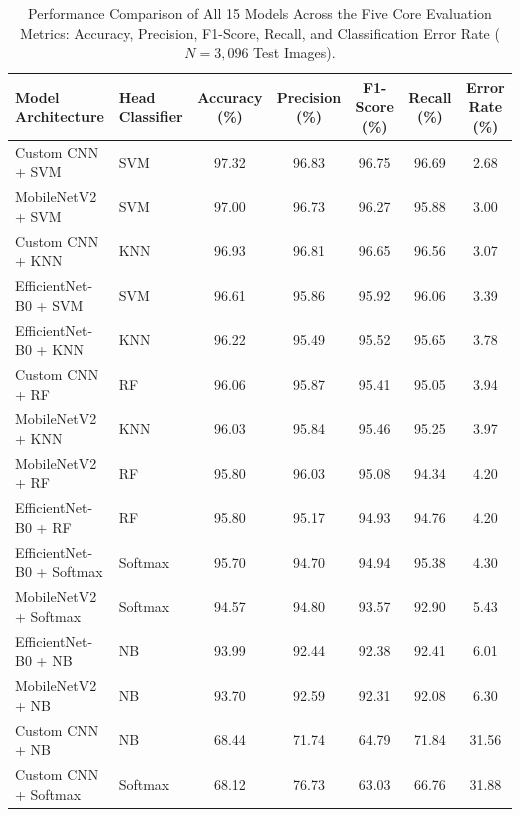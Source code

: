 \begin{table}[t]
\caption{Performance Comparison of All 15 Models Across the Five Core Evaluation Metrics: Accuracy, Precision, F1-Score, Recall, and Classification Error Rate ($N=3{,}096$ Test Images).}
\label{tab:five_metrics_comparison}
\centering
\footnotesize
\begin{tabular}{llccccc}
\toprule
\textbf{Model Architecture} & \textbf{Head Classifier} & \textbf{Accuracy (\%)} & \textbf{Precision (\%)} & \textbf{F1-Score (\%)} & \textbf{Recall (\%)} & \textbf{Error Rate (\%)} \\
\midrule
Custom CNN + SVM & SVM & 97.32 & 96.83 & 96.75 & 96.69 & 2.68 \\
MobileNetV2 + SVM & SVM & 97.00 & 96.73 & 96.27 & 95.88 & 3.00 \\
Custom CNN + KNN & KNN & 96.93 & 96.81 & 96.65 & 96.56 & 3.07 \\
EfficientNet-B0 + SVM & SVM & 96.61 & 95.86 & 95.92 & 96.06 & 3.39 \\
EfficientNet-B0 + KNN & KNN & 96.22 & 95.49 & 95.52 & 95.65 & 3.78 \\
Custom CNN + RF & RF & 96.06 & 95.87 & 95.41 & 95.05 & 3.94 \\
MobileNetV2 + KNN & KNN & 96.03 & 95.84 & 95.46 & 95.25 & 3.97 \\
MobileNetV2 + RF & RF & 95.80 & 96.03 & 95.08 & 94.34 & 4.20 \\
EfficientNet-B0 + RF & RF & 95.80 & 95.17 & 94.93 & 94.76 & 4.20 \\
EfficientNet-B0 + Softmax & Softmax & 95.70 & 94.70 & 94.94 & 95.38 & 4.30 \\
MobileNetV2 + Softmax & Softmax & 94.57 & 94.80 & 93.57 & 92.90 & 5.43 \\
EfficientNet-B0 + NB & NB & 93.99 & 92.44 & 92.38 & 92.41 & 6.01 \\
MobileNetV2 + NB & NB & 93.70 & 92.59 & 92.31 & 92.08 & 6.30 \\
Custom CNN + NB & NB & 68.44 & 71.74 & 64.79 & 71.84 & 31.56 \\
Custom CNN + Softmax & Softmax & 68.12 & 76.73 & 63.03 & 66.76 & 31.88 \\
\bottomrule
\end{tabular}
\end{table}
